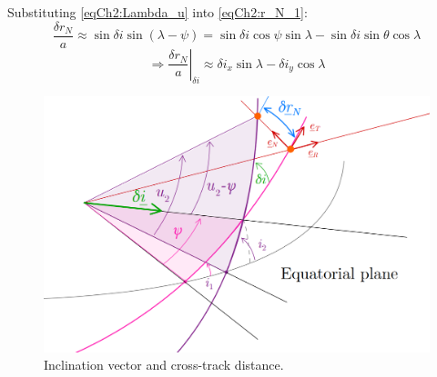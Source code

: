 			\indent Substituting \eqref{eqCh2:Lambda_u} into \eqref{eqCh2:r_N_1}:
			\[
			\dfrac{\delta r_N}{a} \approx \sin\delta i \sin(\lambda - \psi) = \sin\delta i \cos\psi \sin \lambda - \sin\delta i \sin \theta \cos\lambda
			\]
			\begin{equation}
			\label{eqCh2:r_N_2} \Rightarrow \left.\dfrac{\delta r_N}{a}\right\rvert_{\delta i} \approx \delta i_x \sin \lambda - \delta i_y \cos\lambda
			\end{equation}
			\begin{figure}[!htb]
			\centering\includegraphics[width = 0.58\linewidth]{Chapters/Chapter_02/inc_effect}
			\caption{Inclination vector and cross-track distance.}
			\label{figCh2:inc_effect}
			\end{figure}
			\FloatBarrier
